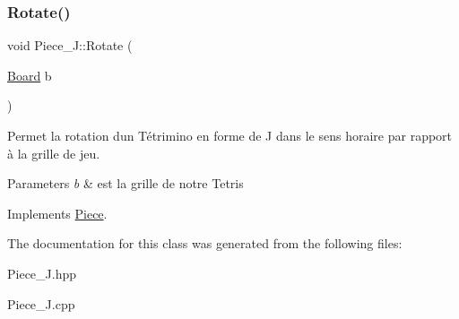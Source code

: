 \mbox{\label{classPiece__J_a05b85a353b6d5cefb0055206d4a39014}} 
\subsubsection{\texorpdfstring{Rotate()}{Rotate()}}
{\footnotesize\ttfamily void Piece\+\_\+\+J\+::\+Rotate (\begin{DoxyParamCaption}\item[{\hyperlink{classBoard}{Board}}]{b }\end{DoxyParamCaption})\hspace{0.3cm}{\ttfamily [virtual]}}



Permet la rotation d\textquotesingle{}un Tétrimino en forme de J dans le sens horaire par rapport à la grille de jeu. 


\begin{DoxyParams}{Parameters}
{\em b} & est la grille de notre Tetris \\
\hline
\end{DoxyParams}


Implements \hyperlink{classPiece_a078f3cc6281cb8f60af3ae2266c651ba}{Piece}.



The documentation for this class was generated from the following files\+:\begin{DoxyCompactItemize}
\item 
Piece\+\_\+\+J.\+hpp\item 
Piece\+\_\+\+J.\+cpp\end{DoxyCompactItemize}
